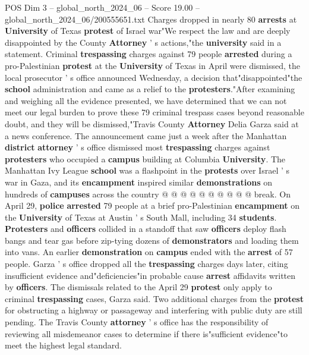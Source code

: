 \begin{textsample}{POS Dim 3 – global\_north\_2024\_06 – Score 19.00 – global\_north\_2024\_06/200555651.txt}  \label{ex:f3_pos_078}
Charges dropped in nearly 80 \textbf{arrests} at \textbf{University} of Texas \textbf{protest} of Israel war"We respect the law and are deeply disappointed by the County \textbf{Attorney} ' s actions,"the \textbf{university} said in a statement.
Criminal \textbf{trespassing} charges against 79 people \textbf{arrested} during a pro-Palestinian \textbf{protest} at the \textbf{University} of Texas in April were dismissed, the local prosecutor ' s office announced Wednesday, a decision that"disappointed"the \textbf{school} administration and came as a relief to the \textbf{protesters}."After examining and weighing all the evidence presented, we have determined that we can not meet our legal burden to prove these 79 criminal trespass cases beyond reasonable doubt, and they will be dismissed,"Travis County \textbf{Attorney} Delia Garza said at a news conference.
The announcement came just a week after the Manhattan \textbf{district} \textbf{attorney} ' s office dismissed most \textbf{trespassing} charges against \textbf{protesters} who occupied a \textbf{campus} building at Columbia \textbf{University}.
The Manhattan Ivy League \textbf{school} was a flashpoint in the \textbf{protests} over Israel ' s war in Gaza, and its \textbf{encampment} inspired similar \textbf{demonstrations} on hundreds of \textbf{campuses} across the country @ @ @ @ @ @ @ @ @ @ break.
On April 29, \textbf{police} \textbf{arrested} 79 people at a brief pro-Palestinian \textbf{encampment} on the \textbf{University} of Texas at Austin ' s South Mall, including 34 \textbf{students}. \textbf{Protesters} and \textbf{officers} collided in a standoff that saw \textbf{officers} deploy flash bangs and tear gas before zip-tying dozens of \textbf{demonstrators} and loading them into vans.
An earlier \textbf{demonstration} on \textbf{campus} ended with the \textbf{arrest} of 57 people.
Garza ' s office dropped all the \textbf{trespassing} charges days later, citing insufficient evidence and"deficiencies"in probable cause \textbf{arrest} affidavits written by \textbf{officers}.
The dismissals related to the April 29 \textbf{protest} only apply to criminal \textbf{trespassing} cases, Garza said.
Two additional charges from the \textbf{protest} for obstructing a highway or passageway and interfering with public duty are still pending.
The Travis County \textbf{attorney} ' s office has the responsibility of reviewing all misdemeanor cases to determine if there is"sufficient evidence"to meet the highest legal standard.

\end{textsample}
